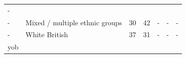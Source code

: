 \documentclass[]{article}
\theoremstyle{definition}
\theoremstyle{definition}
\theoremstyle{definition}
\theoremstyle{remark}
\begin{document}
\begin{longtable}[]{@{}llccccc@{}}
\begin{minipage}[t]{0.06\columnwidth}
-\strut
\end{minipage}\tabularnewline
\begin{minipage}[t]{0.09\columnwidth}\raggedright\strut
-\strut
\end{minipage} & \begin{minipage}[t]{0.24\columnwidth}\raggedright\strut
Mixed / multiple ethnic groups\strut
\end{minipage} & \begin{minipage}[t]{0.16\columnwidth}\centering\strut
30\strut
\end{minipage} & \begin{minipage}[t]{0.12\columnwidth}\centering\strut
42\strut
\end{minipage} & \begin{minipage}[t]{0.07\columnwidth}\centering\strut
-\strut
\end{minipage} & \begin{minipage}[t]{0.06\columnwidth}\centering\strut
-\strut
\end{minipage} & \begin{minipage}[t]{0.06\columnwidth}\centering\strut
-\strut
\end{minipage}\tabularnewline
\begin{minipage}[t]{0.09\columnwidth}\raggedright\strut
-\strut
\end{minipage} & \begin{minipage}[t]{0.24\columnwidth}\raggedright\strut
White British\strut
\end{minipage} & \begin{minipage}[t]{0.16\columnwidth}\centering\strut
37\strut
\end{minipage} & \begin{minipage}[t]{0.12\columnwidth}\centering\strut
31\strut
\end{minipage} & \begin{minipage}[t]{0.07\columnwidth}\centering\strut
-\strut
\end{minipage} & \begin{minipage}[t]{0.06\columnwidth}\centering\strut
-\strut
\end{minipage} & \begin{minipage}[t]{0.06\columnwidth}\centering\strut
-\strut
\end{minipage}\tabularnewline
\begin{minipage}[t]{0.09\columnwidth}\raggedright\strut
yob\strut
\end{minipage} & \begin{minipage}[t]{0.24\columnwidth}\raggedright\strut

\end{minipage}
\end{longtable}
\end{document}
